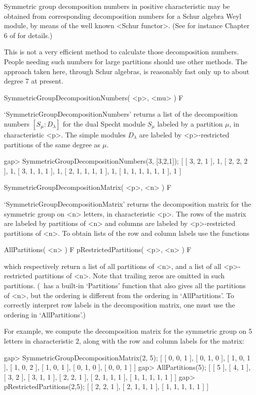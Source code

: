 Symmetric group decomposition numbers in positive characteristic may
be obtained from corresponding decomposition numbers for a Schur
algebra Weyl module, by means of the well known <Schur functor>. (See
for instance Chapter 6 of \cite{Green} for details.)

This is not a very efficient method to calculate those decomposition
numbers. People needing such numbers for large partitions should use
other methods. The approach taken here, through Schur algebras, is
reasonably fast only up to about degree 7 at present.

\>SymmetricGroupDecompositionNumbers( <p>, <mu> ) F

`SymmetricGroupDecompositionNumbers' returns a list of the
decomposition numbers $[S_\mu: D_\lambda]$ for the dual Specht module
$S_\mu$ labeled by a partition $\mu$, in characteristic <p>. The
simple modules $D_\lambda$ are labeled by <p>-restricted partitions of
the same degree as $\mu$.

\beginexample
gap> SymmetricGroupDecompositionNumbers(3, [3,2,1]);
[ [ 3, 2, 1 ], 1, [ 2, 2, 2 ], 1, [ 3, 1, 1, 1 ], 1, [ 2, 1, 1, 1, 1 ], 1, 
  [ 1, 1, 1, 1, 1, 1 ], 1 ]
\endexample

\>SymmetricGroupDecompositionMatrix( <p>, <n> ) F

`SymmetricGroupDecompositionMatrix' returns the decomposition matrix
for the symmetric group on <n> letters, in characteristic <p>. The
rows of the matrix are labeled by partitions of <n> and columns are
labeled by <p>-restricted partitions of <n>. To obtain lists of the
row and column labels use the functions

\>AllPartitions( <n> ) F
\>pRestrictedPartitions( <p>, <n> ) F

which respectively return a list of all partitions of <n>, and a list
of all <p>-restricted partitions of <n>. Note that trailing zeros are
omitted in such partitions. (\GAP\ has a built-in `Partitions' function
that also gives all the partitions of <n>, but the ordering is
different from the ordering in `AllPartitions'. To correctly interpret
row labels in the decomposition matrix, one must use the ordering in
`AllPartitions'.)

For example, we compute the decomposition matrix for the symmetric
group on 5 letters in characteristic 2, along with the row and column
labels for the matrix:

\beginexample
gap> SymmetricGroupDecompositionMatrix(2, 5);
[ [ 0, 0, 1 ], [ 0, 1, 0 ], [ 1, 0, 1 ], [ 1, 0, 2 ], [ 1, 0, 1 ], 
  [ 0, 1, 0 ], [ 0, 0, 1 ] ]
gap> AllPartitions(5);
[ [ 5 ], [ 4, 1 ], [ 3, 2 ], [ 3, 1, 1 ], [ 2, 2, 1 ], [ 2, 1, 1, 1 ], 
  [ 1, 1, 1, 1, 1 ] ]
gap> pRestrictedPartitions(2,5);
[ [ 2, 2, 1 ], [ 2, 1, 1, 1 ], [ 1, 1, 1, 1, 1 ] ]
\endexample



